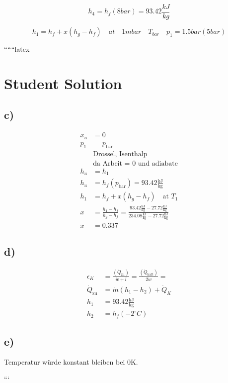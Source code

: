 \[
h_4 = h_f (8 bar) = 93.42 \frac{kJ}{kg}
\]

\[
h_1 = h_f + x (h_g - h_f) \quad at \quad 1 mbar \quad T_{bar} \quad p_{1} = 1.5 bar (5 bar)
\]

``````latex


\section*{Student Solution}

\subsection*{c)}
\begin{align*}
    x_u &= 0 \\
    p_1 &= p_{\text{bar}} \\
    &\text{Drossel, Isenthalp} \\
    &\text{da Arbeit = 0 und adiabate} \\
    h_u &= h_1 \\
    h_u &= h_f(p_{\text{bar}}) = 93.42 \frac{\text{kJ}}{\text{kg}} \\
    h_1 &= h_f + x(h_g - h_f) \quad \text{at } T_1 \\
    x &= \frac{h_1 - h_f}{h_g - h_f} = \frac{93.42 \frac{\text{kJ}}{\text{kg}} - 27.72 \frac{\text{kJ}}{\text{kg}}}{234.08 \frac{\text{kJ}}{\text{kg}} - 27.72 \frac{\text{kJ}}{\text{kg}}} \\
    x &= 0.337
\end{align*}

\subsection*{d)}
\begin{align*}
    \epsilon_K &= \frac{(\dot{Q}_{\text{zu}})}{\dot{w} + l} = \frac{(\dot{Q}_{\text{kalt}})}{2 \dot{w}} = \\
    \dot{Q}_{\text{zu}} &= \dot{m} (h_1 - h_2) + \dot{Q}_K \\
    h_1 &= 93.42 \frac{\text{kJ}}{\text{kg}} \\
    h_2 &= h_f (-2^\circ C)
\end{align*}

\subsection*{e)}
Temperatur würde konstant bleiben bei 0K.

```